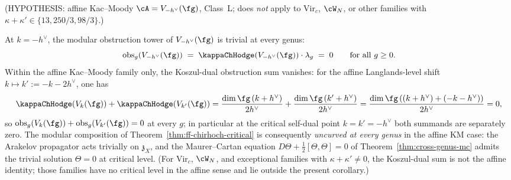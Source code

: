\begin{corollary}
\label{cor:kappa-zero-crit}
\textup{(}\textsf{HYPOTHESIS}: affine Kac--Moody $\cA = V_{-h^\vee}(\fg)$,
Class~L; does \emph{not} apply to Vir$_c$, $\cW_N$, or other
families with $\kappa + \kappa' \in \{13, 250/3, 98/3\}$.\textup{)}%
\par\smallskip\noindent
At $k=-h^\vee$, the modular obstruction tower of $V_{-h^\vee}(\fg)$
is trivial at every genus:
\[
 \operatorname{obs}_g(V_{-h^\vee}(\fg))
 \;=\; \kappaChHodge(V_{-h^\vee}(\fg))\cdot\lambda_g
 \;=\; 0 \qquad\text{for all } g \ge 0.
\]
Within the affine Kac--Moody family only, the
Koszul-dual obstruction sum vanishes: for the affine Langlands-level
shift $k \mapsto k' := -k-2h^\vee$, one has
\[
\kappaChHodge(V_k(\fg)) + \kappaChHodge(V_{k'}(\fg))
= \frac{\dim\fg\,(k+h^\vee)}{2h^\vee}
 + \frac{\dim\fg\,(k'+h^\vee)}{2h^\vee}
= \frac{\dim\fg\,((k+h^\vee)+(-k-h^\vee))}{2h^\vee}
= 0,
\]
so $\operatorname{obs}_g(V_k(\fg)) + \operatorname{obs}_g(V_{k'}(\fg))
= 0$ at every $g$; in particular at the critical self-dual point
$k = k' = -h^\vee$ both summands are separately zero. The modular
composition of Theorem~\textup{\ref{thm:ff-chirhoch-critical}} is
consequently \emph{uncurved at every genus} in the affine KM case:
the Arakelov propagator acts trivially on $\mathfrak{z}_X$, and the
Maurer--Cartan equation $D\Theta + \tfrac12[\Theta,\Theta] = 0$ of
Theorem~\textup{\ref{thm:cross-genus-mc}} admits the trivial solution
$\Theta = 0$ at critical level. (For Vir$_c$, $\cW_N$, and exceptional
families with $\kappa + \kappa' \ne 0$, the Koszul-dual sum is not
the affine identity; those families have no critical level in the
affine sense and lie outside the present corollary.)
\end{corollary}

